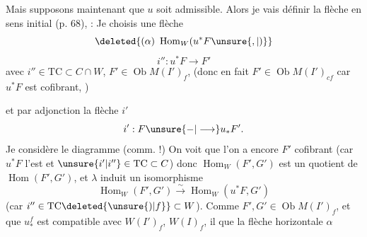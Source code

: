 Mais supposons maintenant que $u$ soit admissible. Alors je vais définir la flèche en sens initial (p. 68), : Je choisis une flèche
\[
\deleted{(\alpha)\ \operatorname{Hom}_W(u^*F\unsure{,|)}}
\]
\[
i'':u^*F\longrightarrow F'
\]
avec $i''\in\mathrm{TC}\subset C\cap W$, $F'\in\operatorname{Ob}M(I')_f$, (donc en fait  $F'\in\operatorname{Ob}M(I')_{cf}$ car $u^*F$ est cofibrant, )

 et par adjonction la flèche $i'$
\[
i':F\unsure{-|\longrightarrow}u_*F'.
\]
Je considère le diagramme (comm. !)
On voit que  l'on a encore $F'$ cofibrant (car $u^*F$ l'est et $\unsure{i'|i''}\in\mathrm{TC}\subset C$) donc $\operatorname{Hom}_W(F',G')$ est un quotient de $\operatorname{Hom}(F',G')$, et $\lambda$ induit un isomorphisme
\[
\operatorname{Hom}_W(F',G')\xrightarrow{\sim}\operatorname{Hom}_W(u^*F,G')
\]
(car $i''\in\mathrm{TC}\deleted{\unsure{)|f}}\subset W$). Comme $F',G'\in\operatorname{Ob}M(I')_f$, et que $u_*^f$ est compatible avec $W(I')_f$, $W(I)_f$, il  que la flèche horizontale $\alpha$
